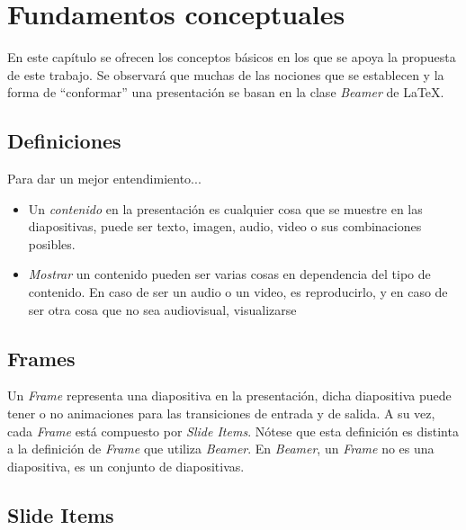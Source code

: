 
\chapter{Fundamentos conceptuales} %
\label{cha:fundamentos_conceptuales}
	En este capítulo se ofrecen los conceptos básicos en los que se apoya la propuesta de este trabajo. Se observará que muchas de las nociones que se establecen y la forma de ``conformar'' una presentación se basan en la clase \textit{Beamer} de \LaTeX{}.

	\section{Definiciones} %
	\label{sec:definiciones}
		Para dar un mejor entendimiento...

		\begin{itemize}
			\item Un \textit{contenido} en la presentación es cualquier cosa que se muestre en las diapositivas, puede ser texto, imagen, audio, video o sus combinaciones posibles.
			\item \textit{Mostrar} un contenido pueden ser varias cosas en dependencia del tipo de contenido. En caso de ser un audio o un video, es reproducirlo, y en caso de ser otra cosa que no sea audiovisual, visualizarse
		\end{itemize}

	\section{Frames} %
	\label{sec:frames}

		Un \textit{Frame} representa una diapositiva en la presentación, dicha diapositiva puede tener o no animaciones para las transiciones de entrada y de salida. A su vez, cada \textit{Frame} está compuesto por \textit{Slide Items}. Nótese que esta definición es distinta a la definición de \textit{Frame} que utiliza \textit{Beamer}. En \textit{Beamer}, un \textit{Frame} no es una diapositiva, es un conjunto de diapositivas.	
	

	\section{Slide Items} %
	\label{sec:slide_items}

